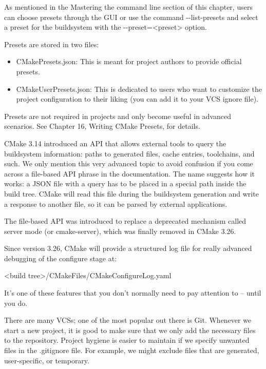 As mentioned in the Mastering the command line section of this chapter, users can choose presets through the GUI or use the command -{}-list-presets and select a preset for the buildsystem with the -{}-preset=<preset> option.

Presets are stored in two files:

\begin{itemize}
\item
CMakePresets.json: This is meant for project authors to provide official presets.

\item
CMakeUserPresets.json: This is dedicated to users who want to customize the project configuration to their liking (you can add it to your VCS ignore file).
\end{itemize}

Presets are not required in projects and only become useful in advanced scenarios. See Chapter 16, Writing CMake Presets, for details.


CMake 3.14 introduced an API that allows external tools to query the buildsystem information: paths to generated files, cache entries, toolchains, and such. We only mention this very advanced topic to avoid confusion if you come across a file-based API phrase in the documentation. The name suggests how it works: a JSON file with a query has to be placed in a special path inside the build tree. CMake will read this file during the buildsystem generation and write a response to another file, so it can be parsed by external applications.

The file-based API was introduced to replace a deprecated mechanism called server mode (or cmake-server), which was finally removed in CMake 3.26.


Since version 3.26, CMake will provide a structured log file for really advanced debugging of the configure stage at:

\begin{shell}
<build tree>/CMakeFiles/CMakeConfigureLog.yaml
\end{shell}

It’s one of these features that you don’t normally need to pay attention to – until you do.


There are many VCSs; one of the most popular out there is Git. Whenever we start a new project, it is good to make sure that we only add the necessary files to the repository. Project hygiene is easier to maintain if we specify unwanted files in the .gitignore file. For example, we might exclude files that are generated, user-specific, or temporary.

